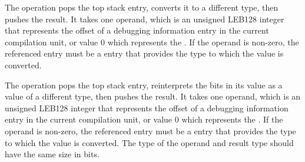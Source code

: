 \begin{enumerate}[1. ]
\itembfnl{\DWOPconvertTARG}
The \DWOPconvertNAME{} operation pops the top stack entry, converts it to a
different type, then pushes the result. It takes one operand, which is an
unsigned LEB128 integer that represents the offset of a debugging
information entry in the current compilation unit, or value 0 which
represents the \specialaddresstype. If the operand is non-zero, the
referenced entry must be a \DWTAGbasetype{} entry that provides the type
to which the value is converted.

\itembfnl{\DWOPreinterpretTARG}
The \DWOPreinterpretNAME{} operation pops the top stack entry, reinterprets
the bits in its value as a value of a different type, then pushes the
result. It takes one operand, which is an unsigned LEB128 integer that
represents the offset of a debugging information entry in the current
compilation unit, or value 0 which represents the \specialaddresstype.
If the operand is non-zero, the referenced entry must be a
\DWTAGbasetype{} entry that provides the type to which the value is converted.
The type of the operand and result type should have the same size in bits.

\end{enumerate}


